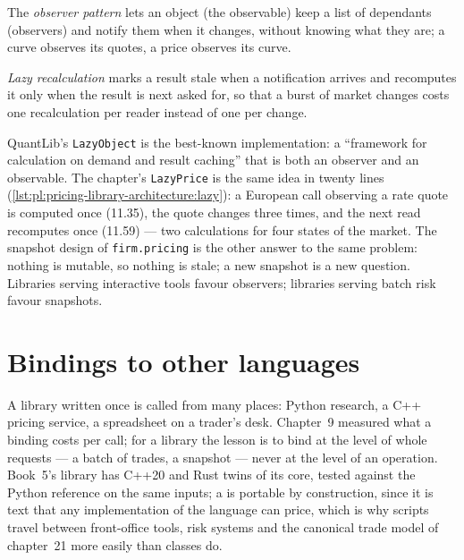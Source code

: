 \begin{definition}\label{def:pl:pricing-library-architecture:observer}
The \emph{observer pattern} lets an object (the observable) keep a list of dependants (observers) and notify them
when it changes, without knowing what they are; a curve observes its quotes, a price observes its curve.
\end{definition}

\begin{definition}\label{def:pl:pricing-library-architecture:lazy}
\emph{Lazy recalculation} marks a result stale when a notification arrives and recomputes it only when the result
is next asked for, so that a burst of market changes costs one recalculation per reader instead of one per change.
\end{definition}

QuantLib's \texttt{LazyObject} is the best-known implementation: a ``framework for calculation on demand and result caching'' that is both
an observer and an observable. The chapter's \texttt{LazyPrice} is the same idea in twenty lines
(\cref{lst:pl:pricing-library-architecture:lazy}): a European call observing a rate quote is computed once (11.35), the quote changes three
times, and the next read recomputes once (11.59) --- two calculations for four states of the market. The snapshot design of
\texttt{firm.pricing} is the other answer to the same problem: nothing is mutable, so nothing is stale; a new snapshot is a new question.
Libraries serving interactive tools favour observers; libraries serving batch risk favour snapshots.

\label{lst:pl:pricing-library-architecture:lazy}

\section{Bindings to other languages}

A library written once is called from many places: Python research, a C++ pricing service, a spreadsheet on a trader's desk. Chapter~9
measured what a binding costs per call; for a library the lesson is to bind at the level of whole requests --- a batch of trades, a snapshot
--- never at the level of an operation. Book~5's library has C++20 and Rust twins of its core, tested against the Python reference on the
same inputs; a  is portable by construction, since it is text that any implementation of the language can price, which is why
scripts travel between front-office tools, risk systems and the canonical trade model of chapter~21 more easily than classes do.

